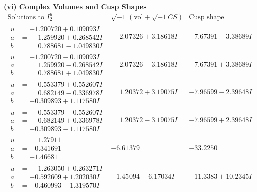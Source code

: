 \documentclass[1p]{elsarticle_modified}
\theoremstyle{definition}
\newcommand{\I}{\sqrt{-1}}
\begin{document}
\newpage\flushleft \textbf{(vi) Complex Volumes and Cusp Shapes}
$$\begin{array}{c|c|c}  
\text{Solutions to }I^u_{2}& \I (\text{vol} + \sqrt{-1}CS) & \text{Cusp shape}\\
 \hline 
\begin{aligned}
u &= -1.200720 + 0.109093 I \\
a &= \phantom{-}1.259920 + 0.268542 I \\
b &= \phantom{-}0.788681 - 1.049830 I\end{aligned}
 & \phantom{-}2.07326 + 3.18618 I & -7.67391 - 3.38689 I \\ \hline\begin{aligned}
u &= -1.200720 - 0.109093 I \\
a &= \phantom{-}1.259920 - 0.268542 I \\
b &= \phantom{-}0.788681 + 1.049830 I\end{aligned}
 & \phantom{-}2.07326 - 3.18618 I & -7.67391 + 3.38689 I \\ \hline\begin{aligned}
u &= \phantom{-}0.553379 + 0.552607 I \\
a &= \phantom{-}0.682149 - 0.336978 I \\
b &= -0.309893 + 1.117580 I\end{aligned}
 & \phantom{-}1.20372 + 3.19075 I & -7.96599 - 2.39648 I \\ \hline\begin{aligned}
u &= \phantom{-}0.553379 - 0.552607 I \\
a &= \phantom{-}0.682149 + 0.336978 I \\
b &= -0.309893 - 1.117580 I\end{aligned}
 & \phantom{-}1.20372 - 3.19075 I & -7.96599 + 2.39648 I \\ \hline\begin{aligned}
u &= \phantom{-}1.27911\phantom{ +0.000000I} \\
a &= -0.341691\phantom{ +0.000000I} \\
b &= -1.46681\phantom{ +0.000000I}\end{aligned}
 & -6.61379\phantom{ +0.000000I} & -33.2250\phantom{ +0.000000I} \\ \hline\begin{aligned}
u &= \phantom{-}1.263050 + 0.263271 I \\
a &= -0.592609 + 1.202030 I \\
b &= -0.460993 - 1.319570 I\end{aligned}
 & -1.45094 - 6.17034 I & -11.3383 + 10.2345 I \\ \hline\begin{aligned}

\end{aligned}
\end{array}$$
\end{document}
